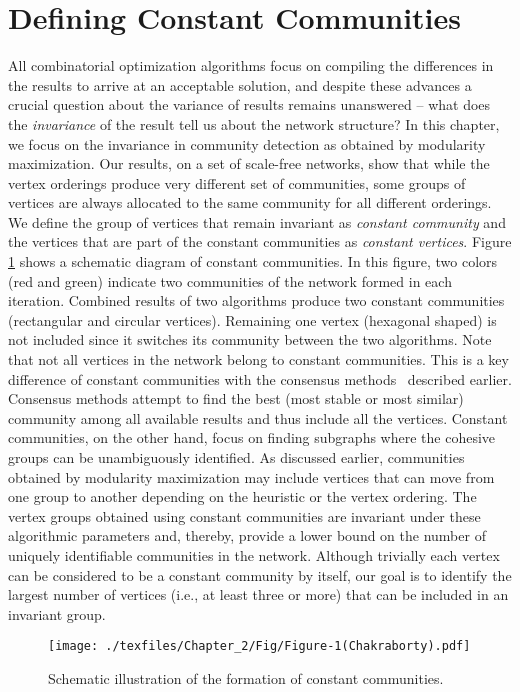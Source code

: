 \section{Defining Constant Communities}
All combinatorial optimization algorithms focus on compiling the differences in the results to arrive at an acceptable solution, and despite
these advances a
crucial question about the variance of results remains unanswered -- what does the {\it invariance} of the result tell us about the network
structure? In this chapter, we focus on the invariance in community detection as obtained by modularity maximization. Our results, on a set
of
scale-free networks, show that while the vertex orderings produce very different set of communities, some groups of vertices are always
allocated to the same community for all different orderings. We define the group of vertices that remain invariant as {\it constant
community} and the vertices that are part of the constant communities as {\it constant vertices}. Figure \ref{fig_constant} shows a
schematic diagram of
constant communities. In this figure, two colors (red and green) indicate two communities of
the network formed in each iteration. Combined results of two algorithms produce two constant communities (rectangular and circular
vertices).
Remaining one vertex (hexagonal shaped) is not included since it switches its community between the two algorithms.
Note that not all vertices in the network belong to constant communities. This is a key difference of constant
communities with the consensus methods~\cite{lf2012} described earlier. Consensus methods attempt to find the best (most stable or most
similar) community among all available results and thus include all the vertices. Constant communities, on the other hand, focus on finding
subgraphs where the cohesive groups can be unambiguously identified. As discussed earlier, communities obtained by modularity maximization
may
include vertices that can move from one group to another depending on the heuristic or the vertex ordering. The vertex groups obtained using
constant communities are invariant under these algorithmic parameters and, thereby, provide a lower bound on the number of uniquely
identifiable communities in the network. Although trivially each vertex can be considered to be a
constant community by itself, our goal is to identify the largest number of vertices (i.e., at least three or more) that can be included in
an invariant group.

\begin{figure}[!t]
\centering
\texttt{[image: ./texfiles/Chapter\_2/Fig/Figure-1(Chakraborty).pdf]}
\caption{ Schematic illustration of the formation of constant communities. }\label{fig_constant}
\end{figure}

